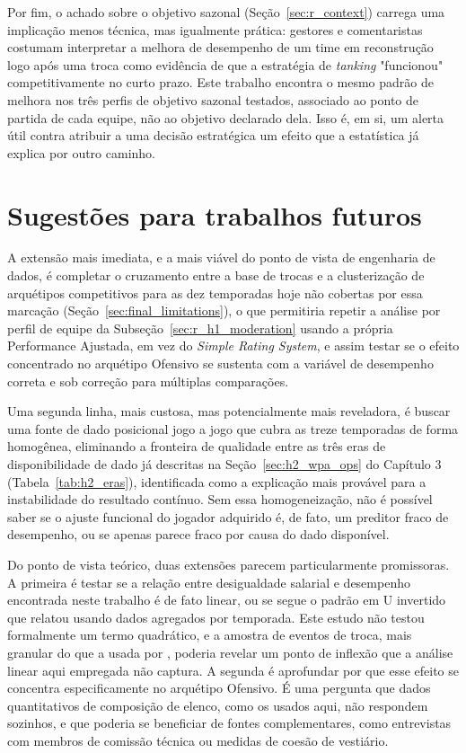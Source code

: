 Por fim, o achado sobre o objetivo sazonal (Seção~\ref{sec:r_context}) carrega uma implicação menos técnica, mas igualmente prática: gestores e comentaristas costumam interpretar a melhora de desempenho de um time em reconstrução logo após uma troca como evidência de que a estratégia de \textit{tanking} "funcionou" competitivamente no curto prazo. Este trabalho encontra o mesmo padrão de melhora nos três perfis de objetivo sazonal testados, associado ao ponto de partida de cada equipe, não ao objetivo declarado dela. Isso é, em si, um alerta útil contra atribuir a uma decisão estratégica um efeito que a estatística já explica por outro caminho.

\section{Sugestões para trabalhos futuros}
\label{sec:future_work}

A extensão mais imediata, e a mais viável do ponto de vista de engenharia de dados, é completar o cruzamento entre a base de trocas e a clusterização de arquétipos competitivos para as dez temporadas hoje não cobertas por essa marcação (Seção~\ref{sec:final_limitations}), o que permitiria repetir a análise por perfil de equipe da Subseção~\ref{sec:r_h1_moderation} usando a própria Performance Ajustada, em vez do \textit{Simple Rating System}, e assim testar se o efeito concentrado no arquétipo Ofensivo se sustenta com a variável de desempenho correta e sob correção para múltiplas comparações.

Uma segunda linha, mais custosa, mas potencialmente mais reveladora, é buscar uma fonte de dado posicional jogo a jogo que cubra as treze temporadas de forma homogênea, eliminando a fronteira de qualidade entre as três eras de disponibilidade de dado já descritas na Seção~\ref{sec:h2_wpa_ops} do Capítulo 3 (Tabela~\ref{tab:h2_eras}), identificada como a explicação mais provável para a instabilidade do resultado contínuo. Sem essa homogeneização, não é possível saber se o ajuste funcional do jogador adquirido é, de fato, um preditor fraco de desempenho, ou se apenas parece fraco por causa do dado disponível.

Do ponto de vista teórico, duas extensões parecem particularmente promissoras. A primeira é testar se a relação entre desigualdade salarial e desempenho encontrada neste trabalho é de fato linear, ou se segue o padrão em U invertido que \citet{ching2019} relatou usando dados agregados por temporada. Este estudo não testou formalmente um termo quadrático, e a amostra de eventos de troca, mais granular do que a usada por \citet{ching2019}, poderia revelar um ponto de inflexão que a análise linear aqui empregada não captura. A segunda é aprofundar por que esse efeito se concentra especificamente no arquétipo Ofensivo. É uma pergunta que dados quantitativos de composição de elenco, como os usados aqui, não respondem sozinhos, e que poderia se beneficiar de fontes complementares, como entrevistas com membros de comissão técnica ou medidas de coesão de vestiário.

